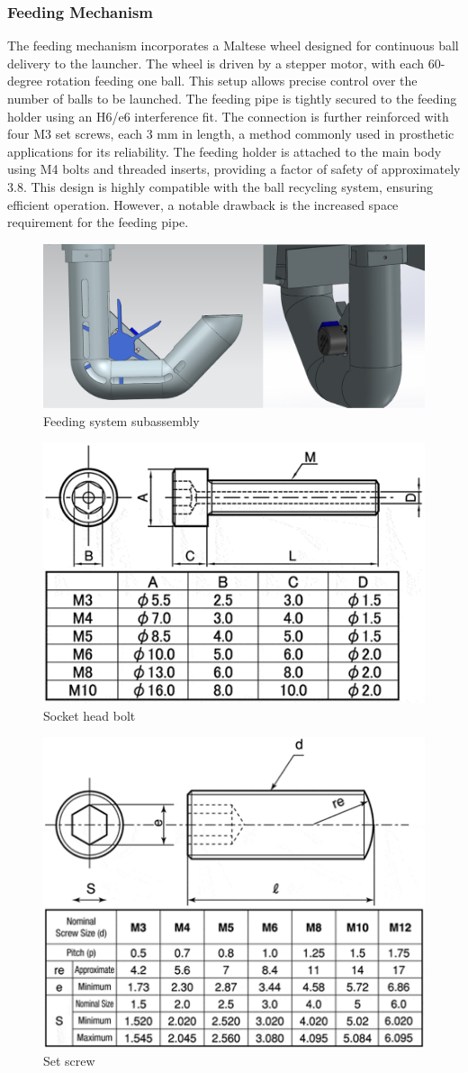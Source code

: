 \documentclass[12pt]{report}
\begin{document}
\subsubsection{Feeding Mechanism}
The feeding mechanism incorporates a Maltese wheel designed for continuous ball delivery to the launcher. The wheel is driven by a stepper motor, with each 60-degree rotation feeding one ball. This setup allows precise control over the number of balls to be launched.
The feeding pipe is tightly secured to the feeding holder using an H6/e6 interference fit. The connection is further reinforced with four M3 set screws, each 3 mm in length, a method commonly used in prosthetic applications for its reliability. The feeding holder is attached to the main body using M4 bolts and threaded inserts, providing a factor of safety of approximately 3.8.
This design is highly compatible with the ball recycling system, ensuring efficient operation. However, a notable drawback is the increased space requirement for the feeding pipe.

\begin{figure}[h!]
    \centering
    \includegraphics[width=0.7\linewidth]{2.3.4.1.png}
    \caption{Feeding system subassembly}
    \label{fig:enter-label}
\end{figure}

\begin{figure}[h!]
    \centering
    \includegraphics[width=0.5\linewidth]{2.3.4.2.png}
    \caption{Socket head bolt}
    \label{fig:enter-label}
\end{figure}

\begin{figure}[h!]
    \centering
    \includegraphics[width=0.5\linewidth]{2.3.4.3.png}
    \caption{Set screw}
    \label{fig:enter-label}
\end{figure}
\end{document}
